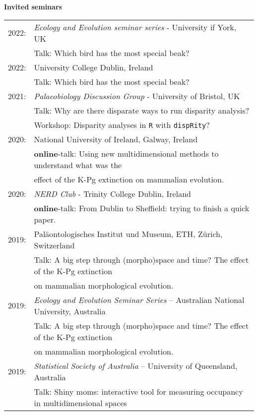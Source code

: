 \documentclass[10pt,a4paper]{article}
\begin{document}
{\raggedright\textbf{Invited seminars}\\[1.5ex]
\begin{tabular}{ll}
2022: & \textit{Ecology and Evolution seminar series} - University if York, UK\\
      & Talk: Which bird has the most special beak?\\
2022: & University College Dublin, Ireland\\
      & Talk: Which bird has the most special beak?\\
2021: & \textit{Palaeobiology Discussion Group} - University of Bristol, UK\\
      & Talk: Why are there disparate ways to run disparity analysis?\\
      & Workshop: Disparity analyses in \texttt{R} with \texttt{dispRity}?\\ 
2020: & National University of Ireland, Galway, Ireland\\
      & \textbf{online}-talk: Using new multidimensional methods to understand what was the\\
      & effect of the K-Pg extinction on mammalian evolution.\\
2020: & \textit{NERD Club} - Trinity College Dublin, Ireland\\
      & \textbf{online}-talk: From Dublin to Sheffield: trying to finish a quick paper.\\
2019: & Pal\"{a}ontologisches Institut und Museum, ETH, Z\"{u}rich, Switzerland\\
      & Talk: A big step through (morpho)space and time? The effect of the K-Pg extinction\\
      & on mammalian morphological evolution.\\
2019: & \textit{Ecology and Evolution Seminar Series} – Australian National University, Australia\\
      & Talk: A big step through (morpho)space and time? The effect of the K-Pg extinction\\
      & on mammalian morphological evolution.\\
2019: & \textit{Statistical Society of Australia} – University of Queensland, Australia\\
      & Talk: Shiny moms: interactive tool for measuring occupancy in multidimensional spaces\\

\end{tabular}}
\end{document}
